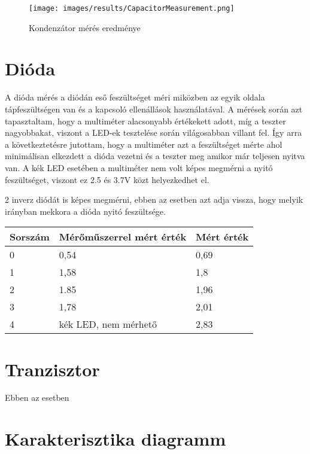    \begin{figure}[H]
        \centering
        \texttt{[image: images/results/CapacitorMeasurement.png]}
        \caption{Kondenzátor mérés eredménye}
        \label{fig:CapacitorResults}
    \end{figure}

\section{Dióda}

A dióda mérés a diódán eső feszültséget méri miközben az egyik oldala
tápfeszültségen van és a kapcsoló ellenállások használatával.
A mérések során azt tapasztaltam, hogy a multiméter alacsonyabb
értékekett adott, míg a teszter nagyobbakat, viszont a LED-ek
tesztelése során világosabban villant fel. Így arra a következtetésre
jutottam, hogy a multiméter azt a feszültséget mérte ahol
minimálisan elkezdett a dióda vezetni és a teszter meg amikor
már teljesen nyitva van. A kék LED esetében a multiméter nem volt képes
megmérni a nyitó feszültséget, viszont ez 2.5 és 3.7V közt helyezkedhet el.

2 inverz diódát is képes megmérni, ebben az esetben azt adja vissza, hogy melyik
irányban mekkora a dióda nyitó feszültsége.

\begin{table}[H]
    \begin{tabular}{lll}
    Sorszám                 & Mérőműszerrel mért érték                  & Mért érték                \\ \hline
    \multicolumn{1}{|l|}{0} & \multicolumn{1}{l|}{0,54}                 & \multicolumn{1}{l|}{0,69} \\ \hline
    \multicolumn{1}{|l|}{1} & \multicolumn{1}{l|}{1,58}                 & \multicolumn{1}{l|}{1,8}  \\ \hline
    \multicolumn{1}{|l|}{2} & \multicolumn{1}{l|}{1.85}                 & \multicolumn{1}{l|}{1,96} \\ \hline
    \multicolumn{1}{|l|}{3} & \multicolumn{1}{l|}{1,78}                 & \multicolumn{1}{l|}{2,01} \\ \hline
    \multicolumn{1}{|l|}{4} & \multicolumn{1}{l|}{kék LED, nem mérhető} & \multicolumn{1}{l|}{2,83} \\ \hline
\end{tabular}
\end{table}

\section{Tranzisztor}

Ebben az esetben 

\section{Karakterisztika diagramm}

